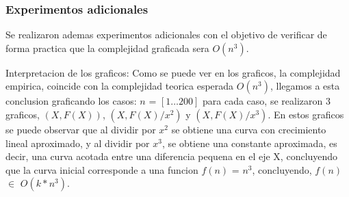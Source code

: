 \subsubsection{Experimentos adicionales}
Se realizaron ademas experimentos adicionales con el objetivo de verificar de forma practica que la complejidad graficada sera $O(n^3)$.

\vspace{2mm}

Interpretacion de los graficos: Como se puede ver en los graficos, la complejidad empirica, coincide con la complejidad teorica esperada $O(n^3)$, llegamos a esta conclusion graficando los casos: $n$ = $[1\dots200]$ para cada caso, se realizaron 3 graficos, $(X,F(X))$,  $(X,F(X)/x^2)$ y $(X,F(X)/x^3)$. En estos graficos se puede observar que al dividir por $x^2$ se obtiene una curva con crecimiento lineal aproximado, y al dividir por $x^3$, se obtiene una constante aproximada, es decir, una curva acotada entre una diferencia pequena en el eje X, concluyendo que la curva inicial corresponde a una funcion $f(n)$ = $n^3$, concluyendo, $f(n)$ $\in$ $O(k*n^3)$.

